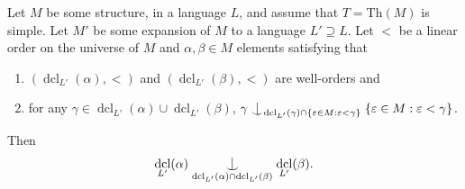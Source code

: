 \documentclass[10pt,a4paper]{amsart}
\DeclareMathOperator{\dcl}{dcl}
\newcommand{\forkindep}[1][]{%
  \mathrel{
    \mathop{
      \vcenter{
        \hbox{\oalign{\noalign{\kern-.3ex}\hfil$\vert$\hfil\cr
              \noalign{\kern-.7ex}
              $\smile$\cr\noalign{\kern-.3ex}}}
      }
    }\displaylimits_{#1}
  }
}
\begin{document}
\begin{lemma}\label{L:technical simple lemma}
Let $M$ be some structure, in a language $L$, and assume that $T=\mathrm{Th}(M)$ is simple. Let $M'$ be some expansion of $M$ to a language $L'\supseteq L$. Let $<$ be a linear order on the universe of $M$ and $\alpha,\beta\in M$ elements satisfying that
\begin{enumerate}
\item $(\dcl_{L'}(\alpha),<)$ and $(\dcl_{L'}(\beta),<)$ are well-orders and
\item  for any $\gamma\in \dcl_{L'}(\alpha)\cup \dcl_{L'}(\beta)$, $\gamma \forkindep[\dcl_{L'}(\gamma)\cap \{\varepsilon\in M:\varepsilon<\gamma\}]\{\varepsilon\in M:\varepsilon<\gamma\}$.
\end{enumerate}


Then  \[\dcl_{L'}(\alpha)\forkindep[\dcl_{L'}(\alpha)\cap \dcl_{L'}(\beta)]\dcl_{L'}(\beta).\]
\end{lemma}
\end{document}
